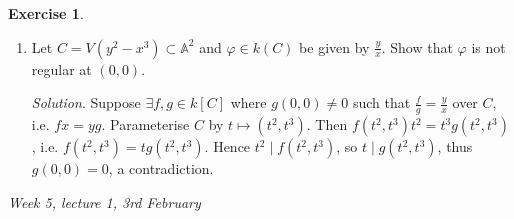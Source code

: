 \documentclass{article}
\newcommand{\A}{\mathbb{A}}
\theoremstyle{definition}
\newtheorem{exe}[defn]{Exercise}
\begin{document}
\begin{exe}
\begin{enumerate}
\textit{Solution}. \begin{enumerate}
\item $V=V(x)\cup V(y)$ and $W=V(y)\cup V(y-x^2)$. One is two axes and the other is $x$-axis with the parabola $y=x^2$, so both are two lines with an intersection at $(0,0)$, hence intuitively they should be isomorphic?
\item $(0,0)$.
\item $W$ is affine, so $f$ is regular if $\exists F\in k[x,y]:F(x,y)=f(x,y) \ \forall (x,y)\in W$. In particular, $y\neq 0$ means $(x,y)\in V(y-x^2)$, so we want $F(x,0)=x^2$ and $F(x,x^2)=0$. Clearly $F(x,y)=x^2-y$ works.
\item By the same analysis, we want $F\in k[x,y]$ with $F(x,0)=x,\ F(x,x^2)=0$. Then write $F(x,y)=x+yG(x,y)$, so $F(x,x^2)=x+x^2G(x,y)=0$, which is impossible.
\item By (a), we can try to fix $V(y)$ and send $V(x)$ to $V(y-x^2)$, i.e. $(x,0)\mapsto (x,0)$ and $(0,y)\mapsto(y,y^2)$. This can be done by simply adding them together: define $f:V\rightarrow W$ via $(x,y)\mapsto (x+y,y^2)$.
\item No. Suppose per contra $\psi:W\rightarrow V$ is an isomorphism. Since $V(x),V(y)$ are symmetric components of $V$ and $\psi$ maps irreducible components to irreducible components, WLOG one has $\psi$ gives isomorphisms $V(y)\cong V(y)$ and $V(y-x^2)\cong V(x)$, and $\psi(0,0)=(0,0)$. Write $\psi(x,y)=(g(x,y),h(x,y))$. Since $V(y)\cong\A^1$, by a previous exercise (\ref{allA1iso}), we have $g(x,y)=\lambda x$ for some $\lambda\in k^\times$, and for $y\neq 0$, $(x,y)\in V(y-x^2)$, so $\psi(x,y)\in V(x)$ and $g(x,y)=0$. This contradicts (d).
\end{enumerate}
\item Let $C=V(y^2-x^3)\subset\A^2$ and $\varphi\in k(C)$ be given by $\frac{y}{x}$. Show that $\varphi$ is not regular at $(0,0)$.

\textit{Solution}. Suppose $\exists f,g\in k[C]$ where $g(0,0)\neq 0$ such that $\frac{f}{g}=\frac{y}{x}$ over $C$, i.e. $fx=yg$. Parameterise $C$ by $t\mapsto (t^2,t^3)$. Then $f(t^2,t^3)t^2=t^3g(t^2,t^3)$, i.e. $f(t^2,t^3)=tg(t^2,t^3)$. Hence $t^2\mid f(t^2,t^3)$, so $t\mid g(t^2,t^3)$, thus $g(0,0)=0$, a contradiction.
\end{enumerate}
\end{exe}

\begin{flushright}
\textit{Week 5, lecture 1, 3rd February}
\end{flushright}
\end{document}

